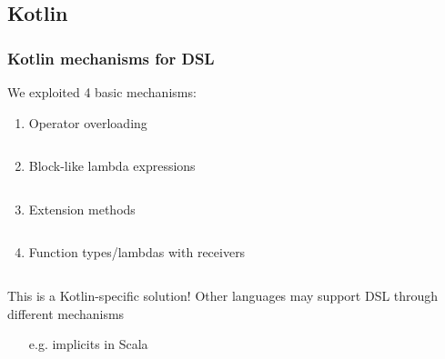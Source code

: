 \documentclass[presentation]{beamer}
\begin{document}
\subsection{Kotlin}

\begin{frame}[allowframebreaks]
    \frametitle{Kotlin mechanisms for DSL}

    We exploited 4 basic mechanisms:

    \medskip

    \begin{enumerate}
        \item Operator overloading
        \inputminted{kotlin}{code/Operators.kt}

        \framebreak

        \item Block-like lambda expressions
        \inputminted{kotlin}{code/Lambdas.kt}

        \item Extension methods
        \inputminted{kotlin}{code/Extensions.kt}

        \framebreak

        \item Function types/lambdas with receivers
        \inputminted{kotlin}{code/Receivers.kt}
    \end{enumerate}

    \framebreak

    \begin{alertblock}{This is a Kotlin-specific solution!}
        Other languages may support DSL through different mechanisms
        \begin{itemize}
            \item[e.g.] implicits in Scala
        \end{itemize}
    \end{alertblock}

\end{frame}
\end{document}
